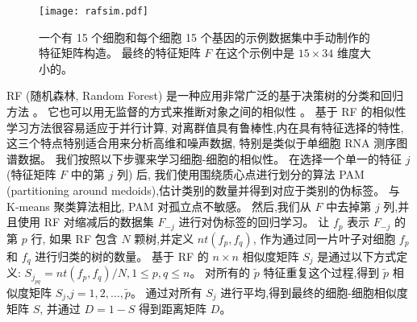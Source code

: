 \begin{figure}[!htbp]
    \centering
    \texttt{[image: rafsim.pdf]}
    \caption{
        一个有 15 个细胞和每个细胞 15 个基因的示例数据集中手动制作的特征矩阵构造。
        最终的特征矩阵 $F$ 在这个示例中是 $15\times34$ 维度大小的。
    }
    \label{fig:rafsim}
\end{figure}

RF (随机森林, Random Forest) 是一种应用非常广泛的基于决策树的分类和回归方法 。
它也可以用无监督的方式来推断对象之间的相似性 。
基于 RF 的相似性学习方法很容易适应于并行计算,
对离群值具有鲁棒性,内在具有特征选择的特性,这三个特点特别适合用来分析高维和噪声数据,
特别是类似于单细胞 RNA 测序图谱数据。
我们按照以下步骤来学习细胞-细胞的相似性。
在选择一个单一的特征 $j$ (特征矩阵 $F$ 中的第 $j$ 列) 后, 
我们使用围绕质心点进行划分的算法 PAM (partitioning around medoids),估计类别的数量并得到对应于类别的伪标签。
与 K-means 聚类算法相比, PAM 对孤立点不敏感。
然后,我们从 $F$ 中去掉第 $j$ 列,并且使用 RF 对缩减后的数据集 $F_{-j}$ 进行对伪标签的回归学习。
让 $f_p$ 表示 $F_{-j}$ 的第 $p$ 行,
如果 RF 包含 $N$ 颗树,并定义 $nt(f_p,f_q)$, 作为通过同一片叶子对细胞 $f_p$ 和 $f_q$ 进行归类的树的数量。
基于 RF 的 $n \times n$ 相似度矩阵 $S_j$ 是通过以下方式定义:
$S_{j_{pq}} = nt(f_p,f_q) / N, 1 \le p,q \le n$。
对所有的 $\tilde{p}$ 特征重复这个过程,得到 $\tilde{p}$ 相似度矩阵 $S_j$,$j=1,2,\ldots,\tilde{p}$。
通过对所有 $S_j$ 进行平均,得到最终的细胞-细胞相似度矩阵 $S$,
并通过 $D=1-S$ 得到距离矩阵 $D$。

